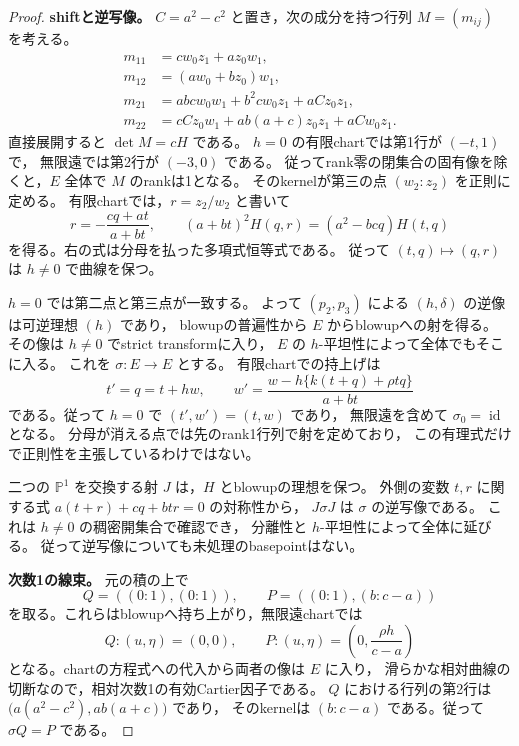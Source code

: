 \begin{proof}
\textbf{shiftと逆写像。}
$C=a^2-c^2$ と置き，次の成分を持つ行列 $M=(m_{ij})$ を考える。
\[
 \begin{aligned}
 m_{11}&=c w_0z_1+a z_0w_1,\\
 m_{12}&=(a w_0+b z_0)w_1,\\
 m_{21}&=abc w_0w_1+b^2c w_0z_1+aCz_0z_1,\\
 m_{22}&=cCz_0w_1+ab(a+c)z_0z_1+aCw_0z_1.
 \end{aligned}
\]
直接展開すると $\det M=cH$ である。
$h=0$ の有限chartでは第1行が $(-t,1)$ で，
無限遠では第2行が $(-3,0)$ である。
従ってrank零の閉集合の固有像を除くと，$E$ 全体で $M$ のrankは1となる。
そのkernelが第三の点 $(w_2:z_2)$ を正則に定める。
有限chartでは，$r=z_2/w_2$ と書いて
\begin{equation}\label{eq:degree-one-point-shift}
 r=-\frac{cq+at}{a+bt},\qquad
 (a+bt)^2H(q,r)=(a^2-bcq)H(t,q)
\end{equation}
を得る。右の式は分母を払った多項式恒等式である。
従って $(t,q)\mapsto(q,r)$ は $h\ne0$ で曲線を保つ。

$h=0$ では第二点と第三点が一致する。
よって $(p_2,p_3)$ による $(h,\delta)$ の逆像は可逆理想 $(h)$ であり，
blowupの普遍性から $E$ からblowupへの射を得る。
その像は $h\ne0$ でstrict transformに入り，
$E$ の $h$-平坦性によって全体でもそこに入る。
これを $\sigma:E\to E$ とする。
有限chartでの持上げは
\begin{equation}\label{eq:degree-one-lifted-shift}
 t'=q=t+hw,\qquad
 w'=\frac{w-h\{k(t+q)+\rho tq\}}{a+bt}
\end{equation}
である。従って $h=0$ で $(t',w')=(t,w)$ であり，
無限遠を含めて $\sigma_0=\operatorname{id}$ となる。
分母が消える点では先のrank1行列で射を定めており，
この有理式だけで正則性を主張しているわけではない。

二つの $\mathbb P^1$ を交換する射 $J$ は，$H$ とblowupの理想を保つ。
外側の変数 $t,r$ に関する式 $a(t+r)+cq+btr=0$ の対称性から，
$J\sigma J$ は $\sigma$ の逆写像である。
これは $h\ne0$ の稠密開集合で確認でき，
分離性と $h$-平坦性によって全体に延びる。
従って逆写像についても未処理のbasepointはない。

\textbf{次数1の線束。}
元の積の上で
\[
 Q=((0:1),(0:1)),\qquad
 P=((0:1),(b:c-a))
\]
を取る。これらはblowupへ持ち上がり，無限遠chartでは
\[
 Q:(u,\eta)=(0,0),\qquad
 P:(u,\eta)=\left(0,\frac{\rho h}{c-a}\right)
\]
となる。chartの方程式への代入から両者の像は $E$ に入り，
滑らかな相対曲線の切断なので，相対次数1の有効Cartier因子である。
$Q$ における行列の第2行は
$\bigl(a(a^2-c^2),ab(a+c)\bigr)$ であり，
そのkernelは $(b:c-a)$ である。従って $\sigma Q=P$ である。


\end{proof}
